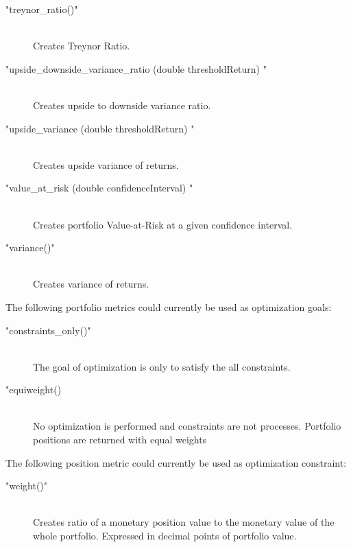 \documentclass[letterpaper]{report}
\newcounter{N}
\begin{document}
\begin{description}
\item["treynor\_ratio()"] \hfill \\ 
Creates Treynor Ratio.

\item["upside\_downside\_variance\_ratio (double thresholdReturn) "] \hfill \\ 
Creates upside to downside variance ratio.

\item["upside\_variance (double thresholdReturn) "] \hfill \\ 
Creates upside variance of returns.


\item["value\_at\_risk (double confidenceInterval) "] \hfill \\ 
Creates portfolio Value-at-Risk at a given confidence interval.

\item["variance()"] \hfill \\ 
Creates variance of  returns.

\end{description}

	

The following portfolio metrics could currently be used as optimization goals: 

\begin{description}

\item["constraints\_only()"] \hfill \\ 
The goal of optimization is only to satisfy the all constraints.

\item["equiweight()] \hfill \\  
No optimization is performed and constraints are not processes.
Portfolio positions are returned with equal weights

\end{description}

The following position metric could currently be used as optimization constraint: 
\begin{description}

\item["weight()"] \hfill \\ 
Creates ratio of a monetary position value to the monetary value of the
whole portfolio. Expressed in decimal points of portfolio value.
\end{description}
\end{document}

